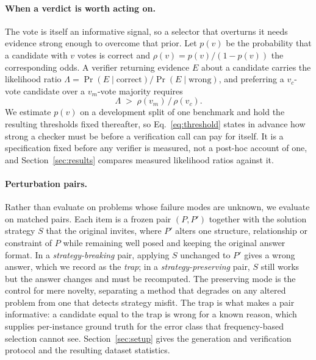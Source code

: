 \documentclass[letterpaper]{article} %
\begin{document}
\paragraph{When a verdict is worth acting on.}
The vote is itself an informative signal, so a selector that overturns it needs
evidence strong enough to overcome that prior. Let $p(v)$ be the probability
that a candidate with $v$ votes is correct and
$\rho(v) = p(v)/(1 - p(v))$ the corresponding odds. A verifier returning
evidence $E$ about a candidate carries the likelihood ratio
$\Lambda = \Pr(E \mid \text{correct}) / \Pr(E \mid \text{wrong})$, and
preferring a $v_c$-vote candidate over a $v_m$-vote majority requires
\begin{equation}
  \Lambda \;>\; \rho(v_m) \,/\, \rho(v_c) .
  \label{eq:threshold}
\end{equation}
We estimate $p(v)$ on a development split of one benchmark and hold the
resulting thresholds fixed thereafter, so Eq.~\eqref{eq:threshold} states in
advance how strong a checker must be before a verification call can pay for
itself. It is a specification fixed before any verifier is measured, not a
post-hoc account of one, and Section~\ref{sec:results} compares measured
likelihood ratios against it.

\paragraph{Perturbation pairs.}
Rather than evaluate on problems whose failure modes are unknown, we evaluate
on matched pairs. Each item is a frozen pair $(P, P')$ together with the
solution strategy $S$ that the original invites, where $P'$ alters one
structure, relationship or constraint of $P$ while remaining well posed and
keeping the original answer format. In a \emph{strategy-breaking} pair,
applying $S$ unchanged to $P'$ gives a wrong answer, which we record as the
\emph{trap}; in a \emph{strategy-preserving} pair, $S$ still works but the
answer changes and must be recomputed. The preserving mode is the control for
mere novelty, separating a method that degrades on any altered problem from one
that detects strategy misfit. The trap is what makes a pair informative: a
candidate equal to the trap is wrong for a known reason, which supplies
per-instance ground truth for the error class that frequency-based selection
cannot see. Section~\ref{sec:setup} gives the generation and verification
protocol and the resulting dataset statistics.

\end{document}
